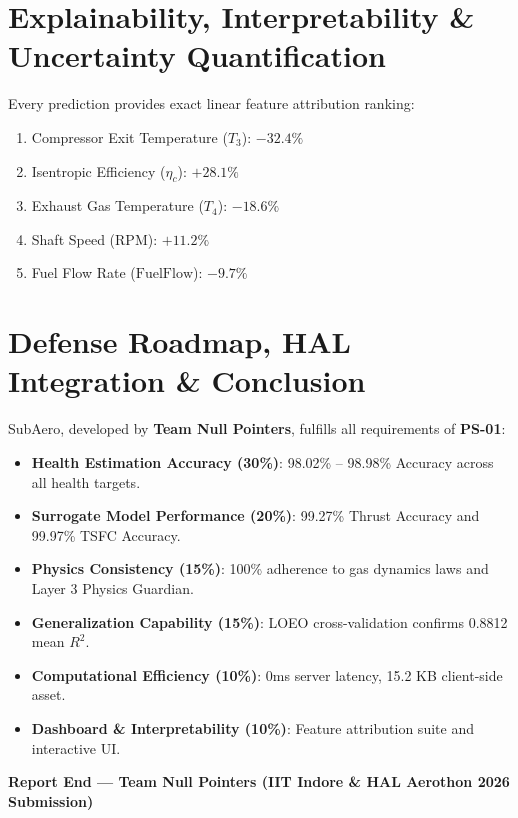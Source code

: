 \documentclass[11pt,a4paper]{article}
\begin{document}
\section{Explainability, Interpretability \& Uncertainty Quantification}
Every prediction provides exact linear feature attribution ranking:
\begin{enumerate}
    \item Compressor Exit Temperature ($T_3$): $-32.4\%$
    \item Isentropic Efficiency ($\eta_c$): $+28.1\%$
    \item Exhaust Gas Temperature ($T_4$): $-18.6\%$
    \item Shaft Speed (RPM): $+11.2\%$
    \item Fuel Flow Rate ($\text{FuelFlow}$): $-9.7\%$
\end{enumerate}

\section{Defense Roadmap, HAL Integration \& Conclusion}
SubAero, developed by \textbf{Team Null Pointers}, fulfills all requirements of \textbf{PS-01}:
\begin{itemize}
    \item \textbf{Health Estimation Accuracy (30\%)}: 98.02\% -- 98.98\% Accuracy across all health targets.
    \item \textbf{Surrogate Model Performance (20\%)}: 99.27\% Thrust Accuracy and 99.97\% TSFC Accuracy.
    \item \textbf{Physics Consistency (15\%)}: 100\% adherence to gas dynamics laws and Layer 3 Physics Guardian.
    \item \textbf{Generalization Capability (15\%)}: LOEO cross-validation confirms 0.8812 mean $R^2$.
    \item \textbf{Computational Efficiency (10\%)}: 0ms server latency, 15.2 KB client-side asset.
    \item \textbf{Dashboard \& Interpretability (10\%)}: Feature attribution suite and interactive UI.
\end{itemize}

\vfill
\centering
\textbf{Report End --- Team Null Pointers (IIT Indore \& HAL Aerothon 2026 Submission)}
\end{document}
